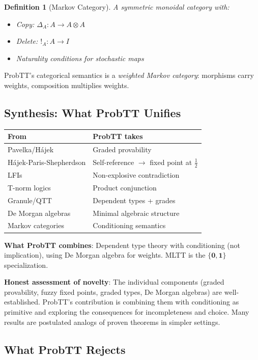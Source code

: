 \documentclass[11pt,a4paper]{article}
\newtheorem{definition}{Definition}[section]
\newcommand{\one}{\mathbf{1}}
\newcommand{\zero}{\mathbf{0}}
\begin{document}
\begin{definition}[Markov Category]
A symmetric monoidal category with:
\begin{itemize}
    \item Copy: $\Delta_A : A \to A \otimes A$
    \item Delete: $!_A : A \to I$
    \item Naturality conditions for stochastic maps
\end{itemize}
\end{definition}

ProbTT's categorical semantics is a \emph{weighted Markov category}: morphisms carry weights, composition multiplies weights.

\subsection{Synthesis: What ProbTT Unifies}

\begin{center}
\begin{tabular}{l|l}
\textbf{From} & \textbf{ProbTT takes} \\
\hline
Pavelka/Hájek & Graded provability \\
Hájek-Paris-Shepherdson & Self-reference $\to$ fixed point at $\frac{1}{2}$ \\
LFIs & Non-explosive contradiction \\
T-norm logics & Product conjunction \\
Granule/QTT & Dependent types + grades \\
De Morgan algebras & Minimal algebraic structure \\
Markov categories & Conditioning semantics \\
\end{tabular}
\end{center}

\textbf{What ProbTT combines}: Dependent type theory with conditioning (not implication), using De Morgan algebra for weights. MLTT is the $\{\zero,\one\}$ specialization.

\textbf{Honest assessment of novelty}: The individual components (graded provability, fuzzy fixed points, graded types, De Morgan algebras) are well-established. ProbTT's contribution is combining them with conditioning as primitive and exploring the consequences for incompleteness and choice. Many results are postulated analogs of proven theorems in simpler settings.

\subsection{What ProbTT Rejects}
\end{document}
